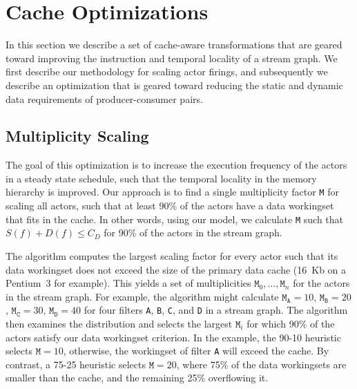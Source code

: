 \section{Cache Optimizations}
\label{sec:cache-opt}

In this section we describe a set of cache-aware transformations that
are geared toward improving the instruction and temporal locality of a
stream graph. We first describe our methodology for scaling actor
firings, and subsequently we describe an optimization that is geared
toward reducing the static and dynamic data requirements of
producer-consumer pairs.



\subsection{Multiplicity Scaling}

The goal of this optimization is to increase the execution frequency
of the actors in a steady state schedule, such that the temporal
locality in the memory hierarchy is improved. Our approach is to find a
single multiplicity factor \texttt{M} for scaling all actors, such that
at least 90\% of the actors have a data workingset that fits in the cache.
In other words, using our model, we calculate \texttt{M} such that 
$S(f) + D(f) \leq C_D$
for 90\% of the actors in the stream graph.

The algorithm 
computes the largest scaling factor for every actor such that its data
workingset does not exceed the size of the primary data cache
(16~Kb on a Pentium~3 for example). This yields a set of multiplicities
${\texttt{M}_0, \ldots, \texttt{M}_n}$ for the actors in the stream
graph. For example, the algorithm might calculate
$\texttt{M}_\texttt{A} = 10$,
$\texttt{M}_\texttt{B} = 20$, 
$\texttt{M}_\texttt{C} = 30$, 
$\texttt{M}_\texttt{D} = 40$ for four filters \texttt{A}, \texttt{B},
\texttt{C}, and \texttt{D} in a stream graph.
The algorithm then examines the
distribution and selects the largest $\texttt{M}_i$
for which 90\% of the actors satisfy our data workingset criterion.
In the example, the 90-10 heuristic
selects $\texttt{M} = 10$, otherwise, the workingset of filter
\texttt{A} will exceed the cache. By contrast,
a 75-25 heuristic selects $\texttt{M} = 20$, where 75\% of the
data workingsets are smaller than the cache, and the remaining 25\%
overflowing it.

